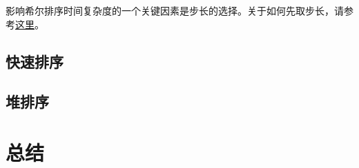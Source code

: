 \documentclass[a4paper, 12pt, titlepage]{article}
\begin{document}
影响希尔排序时间复杂度的一个关键因素是步长的选择。关于如何先取步长，请参考\href{http://zh.wikipedia.org/wiki/\%E5\%B8\%8C\%E5\%B0\%94\%E6\%8E\%92\%E5\%BA\%8F#.E6.AD.A5.E9.95.BF.E5.BA.8F.E5.88.97}{这里}。

\subsection{快速排序}
\label{subsec:quick_sort}

\subsection{堆排序}
\label{subsec:heap_sort}

\section{总结}
\end{document}
